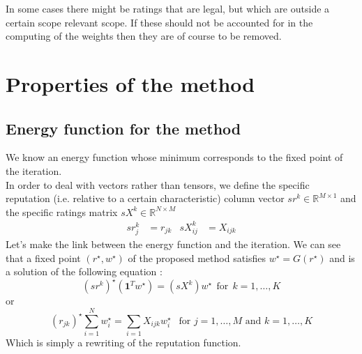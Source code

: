 \documentclass[12pt,a4paper]{article}
\begin{document}
In some cases there might be ratings that are legal, but which are outside a certain scope relevant scope. If these should not be accounted for in the computing of the weights then they are of course to be removed.


\section{Properties of the method}
\subsection{Energy function for the method}
We know an energy function whose minimum corresponds to the fixed point of the iteration.\\
In order to deal with vectors rather than tensors, we define the specific reputation (i.e. relative to a certain characteristic) column vector $ sr^k \in \mathbb{R}^{M\times 1}$ and the specific ratings matrix $sX^k \in \mathbb{R}^{N\times M}$
\begin{align*}
sr^k_{j} &= r_{jk} & sX^k_{ij} &= X_{ijk}
\end{align*}
Let's make the link between the energy function and the iteration. 
We can see that a fixed point $(r^{\star},w^{\star})$ of the proposed method satisfies $ w^{\star} = G(r^{\star})$ and is a solution of the following equation :
$$ (sr^k)^{\star} (\mathbf{1}^Tw^{\star}) = (sX^k)w^{\star} \:\:\text{for} \:\: k = 1,\dots,K$$
or 
$$ (r_{jk})^{\star} \sum_{i=1}^N w_i^{\star} = \sum_{i=1} X_{ijk} w_i^{\star} \:\:\text{ for } j = 1,\dots,M \text{ and } k = 1,\dots,K$$
Which is simply a rewriting of the reputation function.
\end{document}
